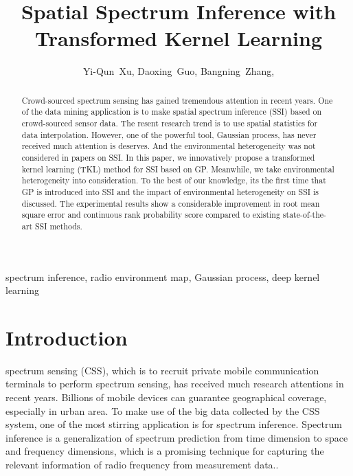 \documentclass[journal, oneside, twocolumn]{IEEEtran}
\date{}
\title{Spatial Spectrum Inference with Transformed Kernel Learning}
\begin{document}
\author{
  Yi-Qun~Xu,
  Daoxing~Guo,%
  Bangning~Zhang,%

}


\maketitle

\begin{abstract}
Crowd-sourced spectrum sensing has gained tremendous attention in recent years. One of the data mining application is to make spatial spectrum inference (SSI) based on crowd-sourced sensor data. The resent research trend is to use spatial statistics for data interpolation. However, one of the powerful tool, Gaussian process, has never received much attention is deserves. And the environmental heterogeneity was not considered in papers on SSI. In this paper, we innovatively propose a transformed kernel learning (TKL) method for SSI based on GP. Meanwhile, we take environmental heterogeneity into consideration. To the best of our knowledge, its the first time that GP is introduced into SSI and the impact of environmental heterogeneity on SSI is discussed. The experimental results show a considerable improvement in root mean square error and continuous rank probability score compared to existing state-of-the-art SSI methods.
\end{abstract}

\begin{IEEEkeywords}
  spectrum inference, radio environment map, Gaussian process, deep kernel learning
\end{IEEEkeywords}

\section{Introduction}
 spectrum sensing (CSS), which is to recruit private mobile communication terminals to perform spectrum sensing, has received much research attentions \cite{Ding2014, Jin2018, Han2019, Hu2020, Amin2020} in recent years. Billions of mobile devices can guarantee geographical coverage, especially in urban area. To make use of the big data collected by the CSS system, one of the most stirring application is for spectrum inference. Spectrum inference is a generalization of spectrum prediction from time dimension to space and frequency dimensions, which is a promising technique for capturing the relevant information of radio frequency from measurement data.\cite{Ding2018}.
\end{document}
